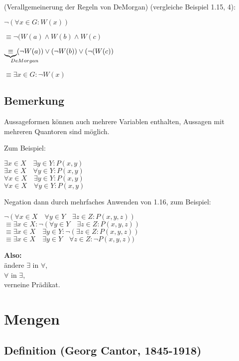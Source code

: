 \documentclass[a4paper, 12pt, twoside] {article}
\begin{document}
(Verallgemeinerung der Regeln von DeMorgan)
(vergleiche Beispiel 1.15, 4):

$\neg (\forall x \in G: W(x))$

$\equiv \neg (W(a) \wedge W(b) \wedge W(c)$

$\underbrace{\equiv}_{\mathrlap{DeMorgan}} (\neg W(a)) \lor (\neg W(b)) \lor (\neg (W(c))$

$\equiv \exists x \in G: \neg W(x)$


\subsection*{Bemerkung}
Aussageformen können auch mehrere Variablen enthalten, Aussagen mit mehreren Quantoren sind möglich.

Zum Beispiel:

$\exists x \in X \quad \exists y \in Y: P(x,y)$ \\
$\exists x \in X \quad \forall y \in Y: P(x,y)$ \\
$\forall x \in X \quad \exists y \in Y: P(x,y)$ \\
$\forall x \in X \quad \forall y \in Y: P(x,y)$

Negation dann durch mehrfaches Anwenden von 1.16, zum Beispiel:

$\neg (\forall x \in X \quad \forall y \in Y \quad \exists z \in Z : P(x,y,z))$ \\
$\equiv \exists x \in X : \neg (\forall y \in Y \quad \exists z \in Z : P(x,y,z))$ \\
$\equiv \exists x \in X \quad \exists y \in Y : \neg (\exists z \in Z : P(x,y,z))$ \\
$\equiv \exists x \in X \quad \exists y \in Y \quad \forall z \in Z : \neg P(x,y,z))$

\textbf{Also: }\\
ändere $\exists$ in $\forall$, \\
\text{\qquad \quad} $\forall$ in $\exists$, \\
verneine Prädikat.


\section{Mengen}

\subsection{Definition (Georg Cantor, 1845-1918)}
\end{document}
